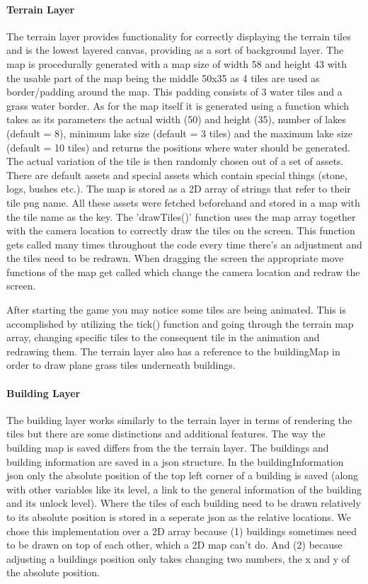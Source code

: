 \documentclass[12pt]{article}
\begin{document}
\paragraph{Terrain Layer}
The terrain layer provides functionality for correctly displaying the terrain tiles and is the lowest layered canvas,
providing as a sort of background layer.
The map is procedurally generated with a map size of width 58 and height 43
with the usable part of the map being the middle 50x35 as 4 tiles are used as border/padding around the map. This padding
consists of 3 water tiles and a grass water border. As for the map itself it is generated using a
function which takes as its parameters the actual width (50) and height (35), number of lakes (default = 8), minimum lake size
(default = 3 tiles) and the maximum lake size (default = 10 tiles) and returns the positions where water should be generated.
The actual variation of the tile is then randomly chosen out of a set of assets. There are default assets and special assets
which contain special things (stone, logs, bushes etc.).
The map is stored as a 2D array of strings that refer to their tile png name.
All these assets were fetched beforehand and stored in a map with the tile name as the key. The 'drawTiles()' function
uses the map array together with the camera location to correctly draw the tiles on the screen. This function gets
called many times throughout the code every time there's an adjustment and the tiles need to be redrawn. When dragging
the screen the appropriate move functions of the map get called which change the camera location and redraw the screen.

After starting the game you may notice some tiles are being animated. This is accomplished by utilizing the tick()
function and going through the terrain map array, changing specific tiles to the consequent tile in the animation and
redrawing them. The terrain layer also has a reference to the buildingMap in order to draw plane grass tiles underneath buildings.

\paragraph{Building Layer} The building layer works similarly to the terrain layer in terms of rendering the tiles but
there are some distinctions and  additional features. The way the building map is saved differs from the the terrain
layer. The buildings and building information are saved in a json structure. In the buildingInformation json only the absolute position of the top left corner of a building is saved (along with other variables like its level, a link to the general information of the building and its unlock level). Where the tiles of each building need to be drawn relatively to its absolute position is stored in a seperate json as the relative locations. We chose this implementation over a 2D array because (1) buildings sometimes need to be drawn on top of each other, which a 2D map  can't do. And (2) because adjusting a buildings position only takes changing two numbers, the x and y of the absolute position.
\end{document}
